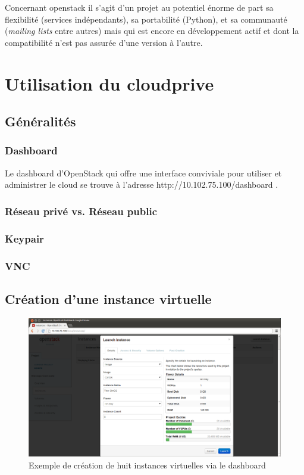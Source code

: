 \documentclass[a4paper,oneside]{report}
\begin{document}
Concernant \gls{openstack} il s'agit d'un projet au potentiel énorme de part sa flexibilité (services indépendants), sa portabilité (Python), et sa communauté (\emph{mailing lists} entre autres) mais qui est encore en développement actif et dont la compatibilité n'est pas assurée d'une version à l'autre.




\appendix
\chapter{Utilisation du \gls{cloudprive}}
\section{Généralités}
\subsection{Dashboard}
Le dashboard d'OpenStack qui offre une interface conviviale pour utiliser et administrer le cloud se trouve à l'adresse http://10.102.75.100/dashboard .

\subsection{Réseau privé vs. Réseau public}

\subsection{Keypair}

\subsection{VNC}


\section{Création d'une instance virtuelle}
\begin{figure}[!h]
\centering
\includegraphics[resolution=200]{images/dashboard_create_details.png}
\caption{Exemple de création de huit instances virtuelles via le dashboard}
\end{figure}
\end{document}
